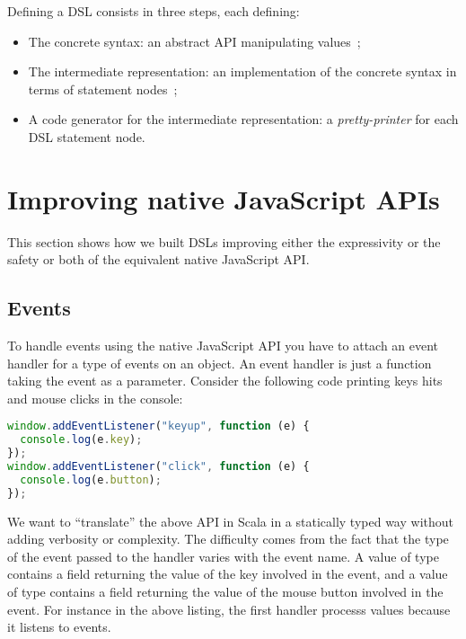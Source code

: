 \documentclass[american,english,runningheads]{llncs}
\begin{document}
Defining a DSL consists in three steps, each defining:

\begin{itemize}
\item The concrete syntax: an abstract API manipulating  values~;
\item The intermediate representation: an implementation of the concrete syntax in terms of statement nodes~;
\item A code generator for the intermediate representation: a \emph{pretty-printer} for each DSL statement node.
\end{itemize}

\section{Improving native JavaScript APIs}
\label{improving}

This section shows how we built DSLs improving either the expressivity or the safety or both of the equivalent native JavaScript API.

\subsection{Events}

To handle events using the native JavaScript API you have to attach an event handler for a type of events on an object. An event handler is just a function taking the event as a parameter. Consider the following code printing keys hits and mouse clicks in the console:

\begin{lstlisting}[language=JavaScript,label=event-js,caption=Native JavaScript API to handle events]
window.addEventListener("keyup", function (e) {
  console.log(e.key);
});
window.addEventListener("click", function (e) {
  console.log(e.button);
});
\end{lstlisting}

We want to “translate” the above API in Scala in a statically typed way without adding verbosity or complexity. The difficulty comes from the fact that the type of the event passed to the handler varies with the event name. A value of type  contains a  field returning the value of the key involved in the event, and a value of type  contains a  field returning the value of the mouse button involved in the event. For instance in the above listing, the first handler processs  values because it listens to  events.
\end{document}
